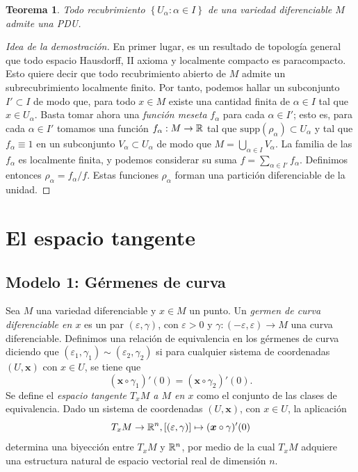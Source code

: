 \documentclass[11pt,a4paper]{amsbook}
\newtheorem{thm}[subsection]{Teorema}
\theoremstyle{remark} \newtheorem{rmk}[subsection]{Observación}
\theoremstyle{definition} \newtheorem{defn}[subsection]{Definición}
\theoremstyle{definition} \newtheorem{ex}[subsection]{Ejemplo}
\theoremstyle{definition} \newtheorem{ej}[subsection]{Ejercicio}
\begin{document}
\begin{thm}
Todo recubrimiento $\left\{ U_\alpha: \alpha \in I \right\}$ de una variedad diferenciable $M$ admite una PDU.
\end{thm}

\begin{proof}[Idea de la demostración]
En primer lugar, es un resultado de topología general que todo espacio Hausdorff, II axioma y localmente compacto es paracompacto. Esto quiere decir que todo recubrimiento abierto de $M$ admite un subrecubrimiento localmente finito. Por tanto, podemos hallar un subconjunto $I'\subset I$ de modo que, para todo $x\in M$ existe una cantidad finita de $\alpha \in I$ tal que $x\in U_\alpha$. Basta tomar ahora una \emph{función meseta} $f_\alpha$ para cada $\alpha\in I'$; esto es, para cada $\alpha \in I'$ tomamos una función $f_\alpha:M\rightarrow \mathbb R$ tal que $\mathrm{supp}(\rho_\alpha)\subset U_\alpha$ y tal que $f_\alpha \equiv 1$ en un subconjunto $V_\alpha \subset U_\alpha$ de modo que $M=\bigcup_{\alpha \in I} V_\alpha$. La familia de las $f_\alpha$ es localmente finita, y podemos considerar su suma $f=\sum_{\alpha \in I'} f_\alpha$. Definimos entonces $\rho_\alpha = f_\alpha/f$. Estas funciones $\rho_\alpha$ forman una partición diferenciable de la unidad.
\end{proof}


\section{El espacio tangente}
\subsection{Modelo 1: Gérmenes de curva} Sea $M$ una variedad diferenciable y $x\in M$ un punto. Un \emph{germen de curva diferenciable en $x$} es un par $(\varepsilon,\gamma)$, con $\varepsilon >0$ y $\gamma:(-\varepsilon,\varepsilon)\rightarrow M$ una curva diferenciable. Definimos una relación de equivalencia en los gérmenes de curva diciendo que $(\varepsilon_1,\gamma_1) \sim (\varepsilon_2,\gamma_2)$ si para cualquier sistema de coordenadas $(U,\bm{x})$ con $x\in U$, se tiene que
\begin{equation*}
(\bm{x} \circ \gamma_1)' (0) = (\bm{x} \circ \gamma_2)'(0).
\end{equation*}
Se define el \emph{espacio tangente $T_xM$ a $M$ en $x$} como el conjunto de las clases de equivalencia. Dado un sistema de coordenadas $(U,\bm{x})$, con $x\in U$, la aplicación
\begin{equation*}
T_xM \rightarrow \mathbb R^n, [(\varepsilon,\gamma)] \mapsto (\bm{x}\circ \gamma)'(0)
\end{equation*}
determina una biyección entre $T_xM$ y $\mathbb R^n$, por medio de la cual $T_xM$ adquiere una estructura natural de espacio vectorial real de dimensión $n$.
\end{document}
